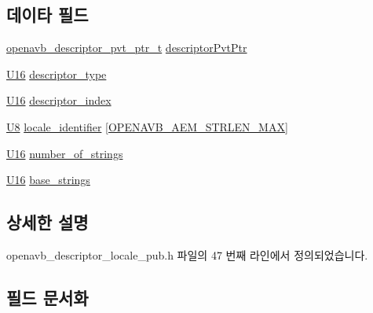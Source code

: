 \subsection*{데이타 필드}
\begin{DoxyCompactItemize}
\item 
\hyperlink{openavb__aem__pub_8h_a85eabab4b7d2466e94c1c3b43b11371d}{openavb\+\_\+descriptor\+\_\+pvt\+\_\+ptr\+\_\+t} \hyperlink{structopenavb__aem__descriptor__locale__t_a302e92fd6cf4d398d5305395359fb157}{descriptor\+Pvt\+Ptr}
\item 
\hyperlink{openavb__types__base__pub_8h_a0a0a322d5fa4a546d293a77ba8b4a71f}{U16} \hyperlink{structopenavb__aem__descriptor__locale__t_a1e231d7874aada5925b29affc76782cc}{descriptor\+\_\+type}
\item 
\hyperlink{openavb__types__base__pub_8h_a0a0a322d5fa4a546d293a77ba8b4a71f}{U16} \hyperlink{structopenavb__aem__descriptor__locale__t_ab26fb363c24b9a2a4391f9171c981b08}{descriptor\+\_\+index}
\item 
\hyperlink{openavb__types__base__pub_8h_aa63ef7b996d5487ce35a5a66601f3e73}{U8} \hyperlink{structopenavb__aem__descriptor__locale__t_a36cd84f65f57b8d5303c2ba47ecffe81}{locale\+\_\+identifier} \mbox{[}\hyperlink{openavb__aem__types__pub_8h_ab2bb82e9f856a76b8305e4864f23ee58}{O\+P\+E\+N\+A\+V\+B\+\_\+\+A\+E\+M\+\_\+\+S\+T\+R\+L\+E\+N\+\_\+\+M\+AX}\mbox{]}
\item 
\hyperlink{openavb__types__base__pub_8h_a0a0a322d5fa4a546d293a77ba8b4a71f}{U16} \hyperlink{structopenavb__aem__descriptor__locale__t_ac77cc84484f0e648649ddbb6e993e7e0}{number\+\_\+of\+\_\+strings}
\item 
\hyperlink{openavb__types__base__pub_8h_a0a0a322d5fa4a546d293a77ba8b4a71f}{U16} \hyperlink{structopenavb__aem__descriptor__locale__t_ae54393237cd0f1ba5da62026c26dd929}{base\+\_\+strings}
\end{DoxyCompactItemize}


\subsection{상세한 설명}


openavb\+\_\+descriptor\+\_\+locale\+\_\+pub.\+h 파일의 47 번째 라인에서 정의되었습니다.



\subsection{필드 문서화}
